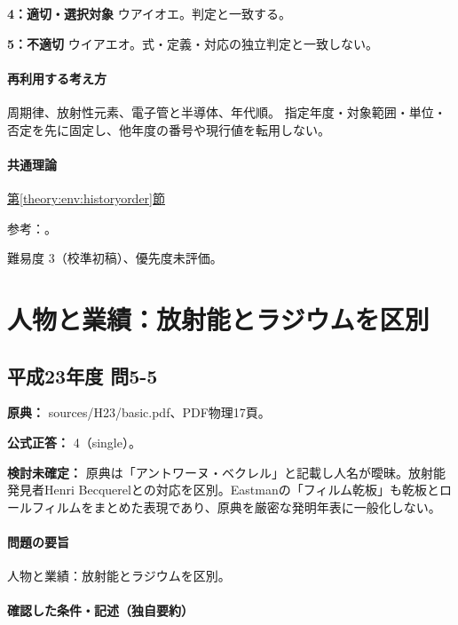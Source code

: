 \noindent\textbf{4：適切・選択対象} ウアイオエ。判定と一致する。\par

\noindent\textbf{5：不適切} ウイアエオ。式・定義・対応の独立判定と一致しない。\par

\paragraph{再利用する考え方} 周期律、放射性元素、電子管と半導体、年代順。 指定年度・対象範囲・単位・否定を先に固定し、他年度の番号や現行値を転用しない。

\paragraph{共通理論} \hyperref[theory:env:historyorder]{第\ref*{theory:env:historyorder}節}

\par 参考：\cite{env58_curie}。

\par 難易度 3（校準初稿）、優先度未評価。

\section{人物と業績：放射能とラジウムを区別}

\subsection{平成23年度 問5-5}
\label{q:h23-reg-basic-5-5}

\noindent\textbf{原典：} sources/H23/basic.pdf、PDF物理17頁。

\textbf{公式正答：} 4（single）。

\par\textbf{検討未確定：} 原典は「アントワーヌ・ベクレル」と記載し人名が曖昧。放射能発見者Henri Becquerelとの対応を区別。Eastmanの「フィルム乾板」も乾板とロールフィルムをまとめた表現であり、原典を厳密な発明年表に一般化しない。

\paragraph{問題の要旨} 人物と業績：放射能とラジウムを区別。

\paragraph{確認した条件・記述（独自要約）}\mbox{}\par

